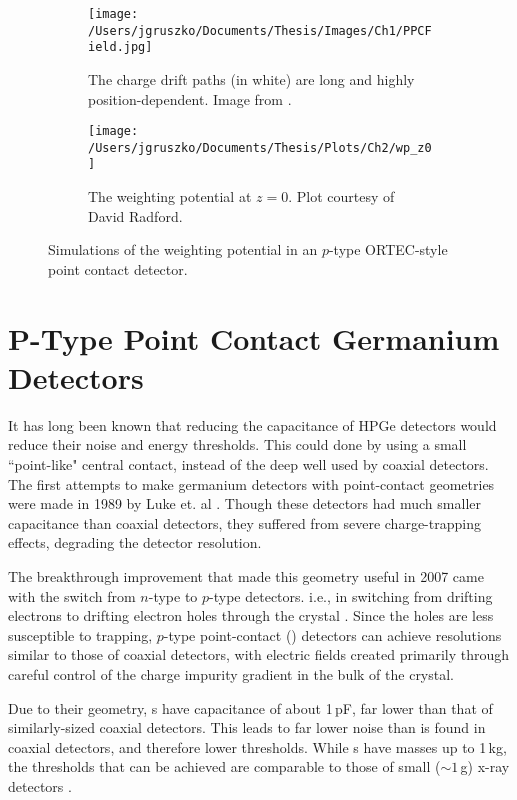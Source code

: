 \begin{figure*}[t]
\centering
\begin{subfigure}[t]{.45\textwidth}
\centering
\texttt{[image: /Users/jgruszko/Documents/Thesis/Images/Ch1/PPCField.jpg]}
\caption[Weighting potential map and drift paths of an ORTEC-type detector]{The charge drift paths (in white) are long and highly position-dependent. Image from \cite{Aalseth2011}.}
\label{fig:ppc_field}
\end{subfigure}
\hfil
\begin{subfigure}[t]{.45\textwidth}
\centering
 \texttt{[image: /Users/jgruszko/Documents/Thesis/Plots/Ch2/wp\_z0]}
 \caption[The weighting potential of a $p$-type point-contact detector]{The weighting potential at $z = 0$. Plot courtesy of David Radford.} 
 \label{fig:wp_z0}
 \end{subfigure}
 \caption{Simulations of the weighting potential in an $p$-type ORTEC-style point contact detector.}
  \label{fig:ppc_wp}
\end{figure*}


\section{P-Type Point Contact Germanium Detectors}
It has long been known that reducing the capacitance of HPGe detectors would reduce their noise and energy thresholds. This could done by using a small ``point-like" central contact, instead of the deep well used by coaxial detectors. The first attempts to make germanium detectors with point-contact geometries were made in 1989 by Luke et. al \cite{Luke1989}. Though these detectors had much smaller capacitance than coaxial detectors, they suffered from severe charge-trapping effects, degrading the detector resolution. 

The breakthrough improvement that made this geometry useful in 2007 came with the switch from $n$-type to $p$-type detectors. i.e., in switching from drifting electrons to drifting electron holes through the crystal \cite{Barbeau2007}. Since the holes are less susceptible to trapping, $p$-type point-contact (\ppc) detectors can achieve resolutions similar to those of coaxial detectors, with electric fields created primarily through careful control of the charge impurity gradient in the bulk of the crystal. 

Due to their geometry, \ppc s have capacitance of about 1\,pF, far lower than that of similarly-sized coaxial detectors. This leads to far lower noise than is found in coaxial detectors, and therefore lower thresholds. While \ppc s have masses up to 1\,kg, the thresholds that can be achieved are comparable to those of small ($\sim1$\,g) x-ray detectors \cite{Barbeau2007}. 

